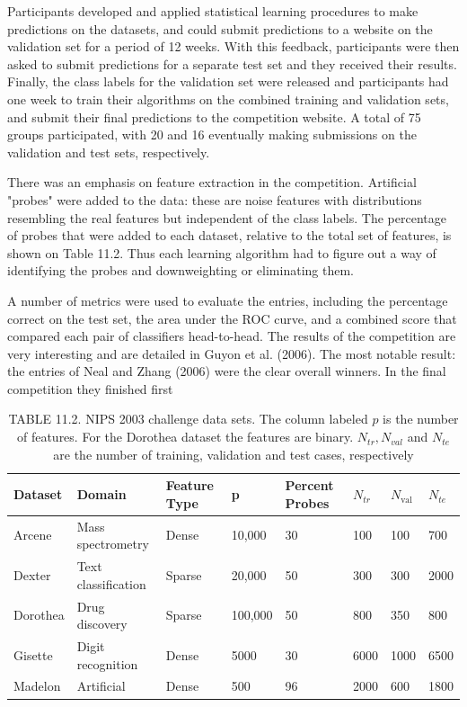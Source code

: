 \documentclass[10pt]{article}
\begin{document}
Participants developed and applied statistical learning procedures to make predictions on the datasets, and could submit predictions to a website on the validation set for a period of 12 weeks. With this feedback, participants were then asked to submit predictions for a separate test set and they received their results. Finally, the class labels for the validation set were released and participants had one week to train their algorithms on the combined training and validation sets, and submit their final predictions to the competition website. A total of 75 groups participated, with 20 and 16 eventually making submissions on the validation and test sets, respectively.

There was an emphasis on feature extraction in the competition. Artificial "probes" were added to the data: these are noise features with distributions resembling the real features but independent of the class labels. The percentage of probes that were added to each dataset, relative to the total set of features, is shown on Table 11.2. Thus each learning algorithm had to figure out a way of identifying the probes and downweighting or eliminating them.

A number of metrics were used to evaluate the entries, including the percentage correct on the test set, the area under the ROC curve, and a combined score that compared each pair of classifiers head-to-head. The results of the competition are very interesting and are detailed in Guyon et al. (2006). The most notable result: the entries of Neal and Zhang (2006) were the clear overall winners. In the final competition they finished first

\begin{table}[h]
\begin{center}
\captionsetup{labelformat=empty}
\caption{TABLE 11.2. NIPS 2003 challenge data sets. The column labeled $p$ is the number of features. For the Dorothea dataset the features are binary. $N_{t r}, N_{v a l}$ and $N_{t e}$ are the number of training, validation and test cases, respectively}
\begin{tabular}{|l|l|l|l|l|l|l|l|}
\hline
Dataset & Domain & Feature Type & p & Percent Probes & $N_{t r}$ & $N_{\text {val }}$ & $N_{t e}$ \\
\hline
Arcene & Mass spectrometry & Dense & 10,000 & 30 & 100 & 100 & 700 \\
\hline
Dexter & Text classification & Sparse & 20,000 & 50 & 300 & 300 & 2000 \\
\hline
Dorothea & Drug discovery & Sparse & 100,000 & 50 & 800 & 350 & 800 \\
\hline
Gisette & Digit recognition & Dense & 5000 & 30 & 6000 & 1000 & 6500 \\
\hline
Madelon & Artificial & Dense & 500 & 96 & 2000 & 600 & 1800 \\
\hline
\end{tabular}
\end{center}
\end{table}
\end{document}
